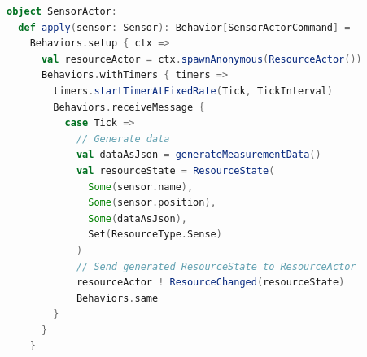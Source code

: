 \documentclass{scrartcl}
\begin{document}
\begin{lstlisting}[language=Scala]
object SensorActor:
  def apply(sensor: Sensor): Behavior[SensorActorCommand] =
    Behaviors.setup { ctx =>
      val resourceActor = ctx.spawnAnonymous(ResourceActor())
      Behaviors.withTimers { timers =>
        timers.startTimerAtFixedRate(Tick, TickInterval)
        Behaviors.receiveMessage {
          case Tick =>
            // Generate data
            val dataAsJson = generateMeasurementData()
            val resourceState = ResourceState(
              Some(sensor.name),
              Some(sensor.position),
              Some(dataAsJson),
              Set(ResourceType.Sense)
            )
            // Send generated ResourceState to ResourceActor
            resourceActor ! ResourceChanged(resourceState)
            Behaviors.same
        }
      }
    }
\end{lstlisting}
\end{document}
